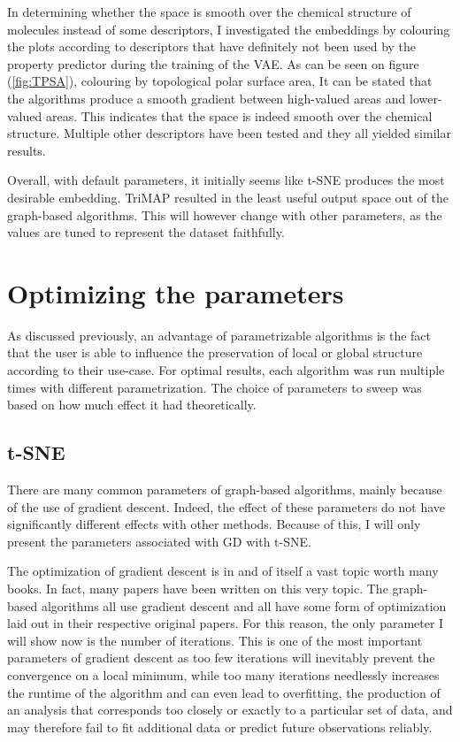 In determining whether the space is smooth over the chemical structure of molecules instead of some descriptors, I investigated the embeddings by colouring the plots according to descriptors that have definitely not been used by the property predictor during the training of the VAE. As can be seen on figure (\ref{fig:TPSA}), colouring by topological polar surface area, It can be stated that the algorithms produce a smooth gradient between high-valued areas and lower-valued areas. This indicates that the space is indeed smooth over the chemical structure. Multiple other descriptors have been tested and they all yielded similar results.

Overall, with default parameters, it initially seems like t-SNE produces the most desirable embedding. TriMAP resulted in the least useful output space out of the graph-based algorithms. This will however change with other parameters, as the values are tuned to represent the dataset faithfully.

\section{Optimizing the parameters}\label{sec:optimizing-the-parameters}

As discussed previously, an advantage of parametrizable algorithms is the fact that the user is able to influence the preservation of local or global structure according to their use-case. For optimal results, each algorithm was run multiple times with different parametrization. The choice of parameters to sweep was based on how much effect it had theoretically. 

\subsection{t-SNE}

There are many common parameters of graph-based algorithms, mainly because of the use of gradient descent. Indeed, the effect of these parameters do not have significantly different effects with other methods. Because of this, I will only present the parameters associated with GD with t-SNE.

The optimization of gradient descent is in and of itself a vast topic worth many books. In fact, many papers have been written on this very topic. The graph-based algorithms all use gradient descent and all have some form of optimization laid out in their respective original papers. For this reason, the only parameter I will show now is the number of iterations. This is one of the most important parameters of gradient descent as too few iterations will inevitably prevent the convergence on a local minimum, while too many iterations needlessly increases the runtime of the algorithm and can even lead to overfitting, the production of an analysis that corresponds too closely or exactly to a particular set of data, and may therefore fail to fit additional data or predict future observations reliably.

